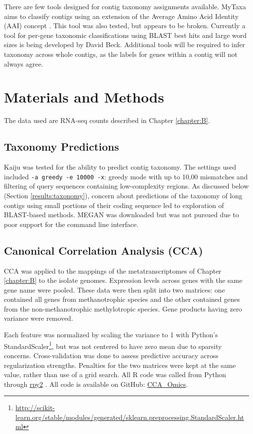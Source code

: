 There are few tools designed for contig taxonomy assignments available.
MyTaxa aims to classify contigs using an extension of the Average Amino Acid Identity (AAI) concept \cite{konstantinidis2005}.
This tool was also tested, but appears to be broken.
Currently a tool for per-gene taxonomic classifications using BLAST best hits and large word sizes is being developed by David Beck.
Additional tools will be required to infer taxonomy across whole contigs, as the labels for genes within a contig will not always agree.


\section{Materials and Methods}

The data used are RNA-seq counts described in Chapter \ref{chapter:B}.

\subsection{Taxonomy Predictions}
Kaiju \cite{menzel2016} was tested for the ability to predict contig taxonomy.
The settings used included \texttt{-a greedy -e 10000 -x}: greedy mode with up to 10,00 mismatches and filtering of query sequences containing low-complexity regions.
As discussed below (Section \ref{results:taxonomy}), concern about predictions of the taxonomy of long contigs using small portions of their coding sequence led to exploration of BLAST-based methods.
MEGAN was downloaded but was not pursued due to poor support for the command line interface.

\subsection{Canonical Correlation Analysis (CCA)}
CCA was applied to the mappings of the metatranscriptomes of Chapter \ref{chapter:B} to the isolate genomes.
Expression levels across genes with the same gene name were pooled.
These data were then split into two matrices: one contained all genes from methanotrophic species and the other contained genes from the non-methanotrophic methylotropic species.
Gene products having zero variance were removed.

Each feature was normalized by scaling the variance to 1 with Python's StandardScaler\footnote{\url{http://scikit-learn.org/stable/modules/generated/sklearn.preprocessing.StandardScaler.html}}, but was not centered to have zero mean due to sparsity concerns.
Cross-validation was done to assess predictive accuracy across regularization strengths.
Penalties for the two matrices were kept at the same value, rather than use of a grid search.  %
All R code was called from Python through \href{https://rpy2.readthedocs.io/en/version_2.8.x/index.html}{rpy2} \cite{gautier2008}.
All code is available on GitHub: \href{https://github.com/JanetMatsen/CCA_Omics}{CCA\_Omics}.

